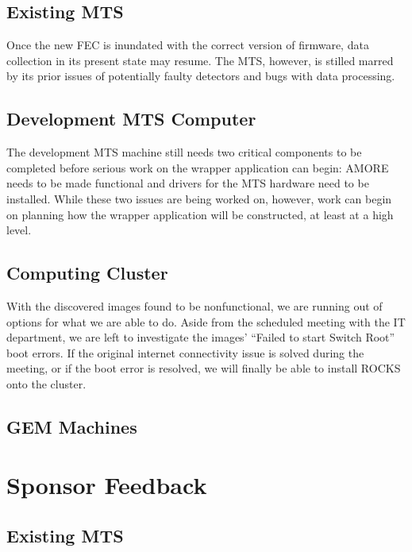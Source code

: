 \documentclass[12pt]{article}
\newcommand\tab[1][1cm]{\hspace*{#1}}
\begin{document}
\subsection{Existing MTS}

\tab Once the new FEC is inundated with the correct version of firmware, data
collection in its present state may resume. The MTS, however, is stilled marred
by its prior issues of potentially faulty detectors and bugs with data
processing.

\subsection{Development MTS Computer}

\tab The development MTS machine still needs two critical components to be
completed before serious work on the wrapper application can begin: AMORE needs
to be made functional and drivers for the MTS hardware need to be
installed. While these two issues are being worked on, however, work can begin
on planning how the wrapper application will be constructed, at least at a high
level.

\subsection{Computing Cluster}

\tab With the discovered images found to be nonfunctional, we are running out of
options for what we are able to do. Aside from the scheduled meeting with the IT
department, we are left to investigate the images' ``Failed to start Switch
Root'' boot errors. If the original internet connectivity issue is solved during
the meeting, or if the boot error is resolved, we will finally be able to
install ROCKS onto the cluster.

\subsection{GEM Machines}


\section{Sponsor Feedback}

\subsection{Existing MTS}

\vspace{1in}
\end{document}
